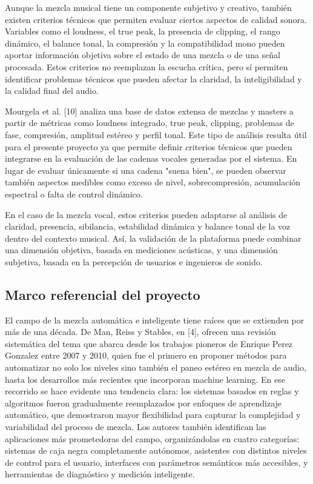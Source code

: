\documentclass[12pt]{article}
\begin{document}
Aunque la mezcla musical tiene un componente subjetivo y creativo, también existen criterios técnicos que permiten evaluar ciertos aspectos de calidad sonora. Variables como el loudness, el true peak, la presencia de clipping, el rango dinámico, el balance tonal, la compresión y la compatibilidad mono pueden aportar información objetiva sobre el estado de una mezcla o de una señal procesada. Estos criterios no reemplazan la escucha crítica, pero sí permiten identificar problemas técnicos que pueden afectar la claridad, la inteligibilidad y la calidad final del audio.

Mourgela et al. [10] analiza una base de datos extensa de mezclas y masters a partir de métricas como loudness integrado, true peak, clipping, problemas de fase, compresión, amplitud estéreo y perfil tonal. Este tipo de análisis resulta útil para el presente proyecto ya que permite definir criterios técnicos que pueden integrarse en la evaluación de las cadenas vocales generadas por el sistema. En lugar de evaluar únicamente si una cadena "suena bien", se pueden observar también aspectos medibles como exceso de nivel, sobrecompresión, acumulación espectral o falta de control dinámico.

En el caso de la mezcla vocal, estos criterios pueden adaptarse al análisis de claridad, presencia, sibilancia, estabilidad dinámica y balance tonal de la voz dentro del contexto musical. Así, la validación de la plataforma puede combinar una dimensión objetiva, basada en mediciones acústicas, y una dimensión subjetiva, basada en la percepción de usuarios e ingenieros de sonido.

\subsection*{Marco referencial del proyecto}

El campo de la mezcla automática e inteligente tiene raíces que se extienden por más de una década. De Man, Reiss y Stables, en [4], ofrecen una revisión sistemática del tema que abarca desde los trabajos pioneros de Enrique Perez Gonzalez entre 2007 y 2010, quien fue el primero en proponer métodos para automatizar no solo los niveles sino también el paneo estéreo en mezcla de audio, hasta los desarrollos más recientes que incorporan machine learning. En ese recorrido se hace evidente una tendencia clara: los sistemas basados en reglas y algoritmos fueron gradualmente reemplazados por enfoques de aprendizaje automático, que demostraron mayor flexibilidad para capturar la complejidad y variabilidad del proceso de mezcla. Los autores también identifican las aplicaciones más prometedoras del campo, organizándolas en cuatro categorías: sistemas de caja negra completamente autónomos, asistentes con distintos niveles de control para el usuario, interfaces con parámetros semánticos más accesibles, y herramientas de diagnóstico y medición inteligente.
\end{document}
